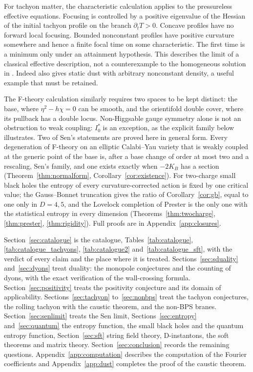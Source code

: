 For tachyon matter, the characteristic calculation applies to the pressureless effective equations. Focusing is controlled by a positive eigenvalue of the Hessian of the initial tachyon profile on the branch $\partial_tT>0$. Concave profiles have no forward local focusing. Bounded nonconstant profiles have positive curvature somewhere and hence a finite focal time on some characteristic. The first time is a minimum only under an attainment hypothesis. This describes the limit of a classical effective description, not a counterexample to the homogeneous solution in \cite{Sen02rolling,Sen02matter}. Indeed \cite{Sen02field} also gives static dust with arbitrary nonconstant density, a useful example that must be retained.

The F-theory calculation similarly requires two spaces to be kept distinct: the base, where $\eta^2-h\chi=0$ can be smooth, and the orientifold double cover, where its pullback has a double locus. Non-Higgsable gauge symmetry alone is not an obstruction to weak coupling: $I_0^*$ is an exception, as the explicit family below illustrates. Two of Sen's statements are proved here in general form. Every degeneration of F-theory on an elliptic Calabi--Yau variety that is weakly coupled at the generic point of the base is, after a base change of order at most two and a rescaling, Sen's family, and one exists exactly when $-2K_B$ has a section (Theorem~\ref{thm:normalform}, Corollary~\ref{cor:existence}). For two-charge small black holes the entropy of every curvature-corrected action is fixed by one critical value; the Gauss--Bonnet truncation gives the ratio of Corollary~\ref{cor:gb}, equal to one only in $D=4,5$, and the Lovelock completion of Prester is the only one with the statistical entropy in every dimension (Theorems~\ref{thm:twocharge}, \ref{thm:prester}, \ref{thm:rigidity}). Full proofs are in Appendix~\ref{app:closures}.

 Section~\ref{sec:catalogue} is the catalogue, Tables~\ref{tab:catalogue}, \ref{tab:catalogue_tachyons}, \ref{tab:catalogue2} and~\ref{tab:catalogue_sft}, with the verdict of every claim and the place where it is treated. Sections~\ref{sec:sduality} and~\ref{sec:dyons} treat duality: the monopole conjectures and the counting of dyons, with the exact verification of the wall-crossing formula. Section~\ref{sec:positivity} treats the positivity conjecture and its domain of applicability. Sections~\ref{sec:tachyon} to~\ref{sec:nonbps} treat the tachyon conjectures, the rolling tachyon with the caustic theorem, and the non-BPS branes. Section~\ref{sec:senlimit} treats the Sen limit, Sections~\ref{sec:entropy} and~\ref{sec:quantum} the entropy function, the small black holes and the quantum entropy function, Section~\ref{sec:sft} string field theory, D-instantons, the soft theorems and matrix theory. Section~\ref{sec:conclusion} records the remaining questions. Appendix~\ref{app:computation} describes the computation of the Fourier coefficients and Appendix~\ref{app:dust} completes the proof of the caustic theorem.


